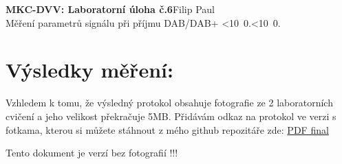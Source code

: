 \documentclass[10pt, a4paper]{article}%
\def\mydate{\leavevmode\hbox{\twodigits\day.\twodigits\month.\the\year}}
\def\twodigits#1{\ifnum#1<10 0\fi\the#1}
\begin{document}
\begin{flushleft}%
	\textbf{\Large{MKC-DVV: Laboratorní úloha č.6}}\hfill Filip Paul\\
	\large{Měření parametrů signálu při příjmu DAB/DAB+ \hfill\mydate}

\end{flushleft}
\section{\Large Výsledky měření:}
\noindent Vzhledem k tomu, že výsledný protokol obsahuje fotografie ze 2 laboratorních cvičení a jeho velikost překračuje 5MB.
Přidávám odkaz na protokol ve verzi s fotkama, kterou si můžete stáhnout z mého github repozitáře zde:
\href{https://github.com/FilipPaul/PATAK_zimni/blob/main/DVV/LAB6/DVV_LAB_2a6_PAUL.pdf}{\color{blue}PDF final}


\noindent Tento dokument je verzí bez fotografií !!!\\ 
\end{document}
